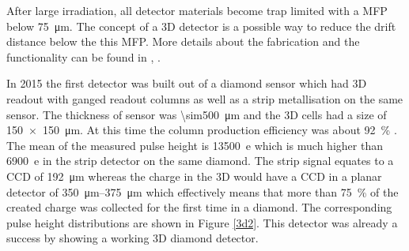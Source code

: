 After large irradiation, all detector materials become trap limited with a \ac{MFP} below \SI{75}{\micro\meter}. The concept of a 3D detector is a possible way to reduce the drift distance below the this \ac{MFP}. More details about the fabrication and the functionality can be found in \cite{3D}, \cite{parker}.\par
In 2015 the first detector was built out of a \pcvd diamond sensor which had 3D readout 
with ganged readout columns as well as a strip metallisation on the same sensor. The thickness of sensor was \SI{\sim500}{\micro\meter} and the 3D cells had a size of \SI{150x150}{\micro\meter}. At this time the column production efficiency was about \SI{92}{\%} \cite{felix}.
The mean of the measured pulse height is \SI{13500}{e} which is much higher than \SI{6900}{e} in the strip detector on the same diamond. The strip signal equates to a \ac{CCD} of \SI{192}{\micro\meter} whereas the charge in the 3D would have a \ac{CCD} in a planar detector of \SIrange{350}{375}{\micro\meter} which effectively means that more than \SI{75}{\%} of the created charge was collected for the first time in a \pcvd diamond. The corresponding pulse height distributions are shown in Figure \vref{3d2}. This detector was already a success by showing a working 3D diamond detector. \par
